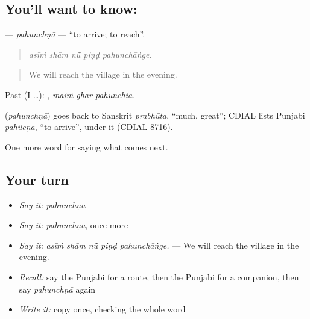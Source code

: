 \subsection*{You'll want to know: }
\textbf{} — \emph{pahunchṇā} — \textquotedblleft{}to arrive; to reach\textquotedblright{}.

\begin{quote}
    
\end{quote}

\begin{quote}
\emph{asīṁ shām nū̃ piṇḍ pahunchāṅge.}
\end{quote}

\begin{quote}
We will reach the village in the evening.
\end{quote}

Past (I …):   , \emph{maiṁ ghar pahunchiā}.

\begin{cousinweb}
\textbf{} (\emph{pahunchṇā}) goes back to Sanskrit \emph{prabhūta}, \textquotedblleft{}much, great\textquotedblright{}; CDIAL lists Punjabi \emph{pahũcṇā}, \textquotedblleft{}to arrive\textquotedblright{}, under it (CDIAL 8716).
\end{cousinweb}

\begin{grammarlens}[title={What you've built}]
One more word for saying what comes next.
\end{grammarlens}

\subsection*{Your turn}
\begin{itemize}
\raggedright
  \item \emph{Say it:} \emph{pahunchṇā}
  \item \emph{Say it:} \emph{pahunchṇā}, once more
  \item \emph{Say it:} \emph{asīṁ shām nū̃ piṇḍ pahunchāṅge.} — We will reach the village in the evening.
  \item \emph{Recall:} say the Punjabi for a route, then the Punjabi for a companion, then say \emph{pahunchṇā} again
  \item \emph{Write it:} copy \textbf{} once, checking the whole word
\end{itemize}

